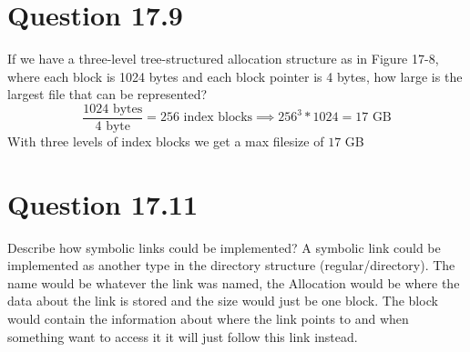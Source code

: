 \documentclass{article}
\begin{document}
\section*{Question 17.9}
If we have a three-level tree-structured allocation structure as in Figure 17-8, where each block is 1024 bytes and each block pointer is 4 bytes, how large is the largest file that can be represented?
\newline
$$ \frac{1024 \text{ bytes}}{4\text{ byte}} = 256 \text{ index blocks} \implies 256^{3} * 1024 = 17\text{ GB}$$
With three levels of index blocks we get a max filesize of $17$ GB

\section*{Question 17.11}
Describe how symbolic links could be implemented?
\newline
A symbolic link could be implemented as another type in the directory structure (regular/directory).
The name would be whatever the link was named, the Allocation would be where the data about the link is stored and the size would just be one block.
The block would contain the information about where the link points to and when something want to access it it will just follow this link instead.
\end{document}
